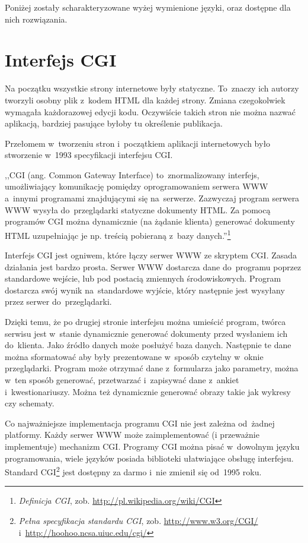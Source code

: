 \documentclass[a4paper,12pt,oneside]{report}
\begin{document}
Poniżej zostały scharakteryzowane wyżej wymienione języki, oraz dostępne dla nich rozwiązania.

\section{Interfejs CGI}
\label{sec:cgi}
Na początku wszystkie strony internetowe były statyczne. To~znaczy ich autorzy tworzyli osobny plik z~kodem HTML dla każdej strony. Zmiana czegokolwiek wymagała każdorazowej edycji kodu. Oczywiście takich stron nie można nazwać aplikacją, bardziej pasujące byłoby tu określenie publikacja.

Przełomem w~tworzeniu stron i~początkiem aplikacji internetowych było stworzenie w~1993 specyfikacji interfejsu CGI.

,,CGI (ang. Common Gateway Interface) to~znormalizowany interfejs, umożliwiający komunikację pomiędzy oprogramowaniem serwera WWW a~innymi programami znajdującymi się na~serwerze. Zazwyczaj program serwera WWW wysyła do~przeglądarki statyczne dokumenty HTML. Za pomocą programów CGI można dynamicznie (na żądanie klienta) generować dokumenty HTML uzupełniając je np. treścią pobieraną z~bazy danych.''\footnote{\emph{Definicja CGI}, zob. \url{http://pl.wikipedia.org/wiki/CGI}}

Interfejs CGI jest ogniwem, które łączy serwer WWW ze skryptem CGI. Zasada działania jest bardzo prosta. Serwer WWW dostarcza dane do~programu poprzez standardowe wejście, lub pod postacią zmiennych środowiskowych. Program dostarcza swój wynik na~standardowe wyjście, który następnie jest wysyłany przez serwer do~przeglądarki. 

Dzięki temu, że po drugiej stronie interfejsu można umieścić program, twórca serwisu jest w~stanie dynamicznie generować dokumenty przed wysłaniem ich do~klienta. Jako źródło danych może posłużyć baza danych. Następnie te dane można sformatować aby były prezentowane w~sposób czytelny w~oknie przeglądarki. Program może otrzymać dane z~formularza jako parametry, można w~ten sposób generować, przetwarzać i~zapisywać dane z~ankiet i~kwestionariuszy. Można też dynamicznie generować obrazy takie jak wykresy czy schematy.

Co najważniejsze implementacja programu CGI nie jest zależna od~żadnej platformy. Każdy serwer WWW może zaimplementować (i przeważnie implementuje) mechanizm CGI. Programy CGI można pisać w~dowolnym języku programowania, wiele języków posiada biblioteki ułatwiające obsługę interfejsu. Standard CGI\footnote{\emph{Pełna specyfikacja standardu CGI}, zob. \url{http://www.w3.org/CGI/} i~\url{http://hoohoo.ncsa.uiuc.edu/cgi/}} jest dostępny za darmo i~nie zmienił się od~1995 roku. 
\end{document}

